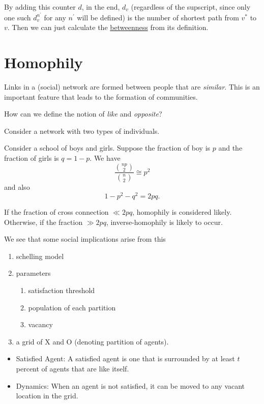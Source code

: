 \begin{remark}
	By adding this counter \(d\), in the end, \(d_v\) (regardless of the supscript, since only one such \(d_v^{n^\prime }\) for any \(n^\prime \) will be defined) is the number of shortest path from \(v^{\ast} \) to \(v\). Then we can just calculate the \hyperref[def:betweenness]{betweenness} from its definition.
\end{remark}

\section{Homophily}
Links in a (social) network are formed between people that are \emph{similar}. This is an important feature that leads to the formation of communities.

\begin{problem}
How can we define the notion of \emph{like} and \emph{opposite}?
\end{problem}
\begin{answer}
	Consider a network with two types of individuals.
\end{answer}

\begin{eg}
	Consider a school of boys and girls. Suppose the fraction of boy is $p$ and the fraction of girls is $q = 1 - p$. We have
	\[
		\frac{\binom{np}{2}}{\binom{n}{2}} \cong p^2
	\]
	and also
	\[
		1 - p^2 - q^2 = 2pq.
	\]

	If the fraction of cross connection $\ll 2pq$, homophily is considered likely. Otherwise, if the fraction $\gg 2pq$, inverse-homophily is likely to occur.
\end{eg}

We see that some social implications arise from this
\begin{enumerate}
	\item schelling model
	\item parameters
	      \begin{enumerate}
		      \item satisfaction threshold
		      \item population of each partition
		      \item vacancy
	      \end{enumerate}
	\item a grid of X and O (denoting partition of agents).
\end{enumerate}

\begin{itemize}
	\item Satisfied Agent: A satisfied agent is one that is surrounded by at least \(t\) percent of agents that are like itself.
	\item Dynamics: When an agent is not satisfied, it can be moved to any vacant location in the grid.
\end{itemize}

